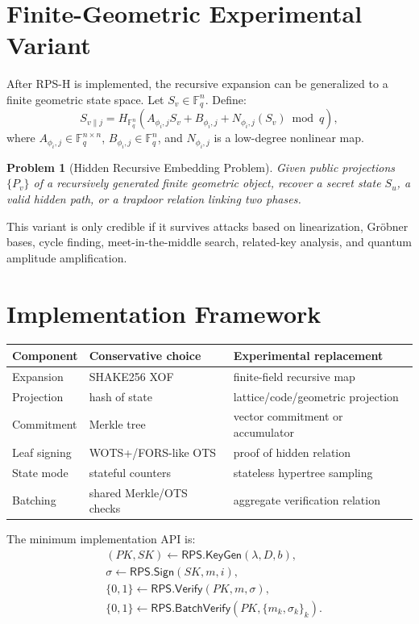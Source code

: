 \documentclass[11pt]{article}
\newtheorem{problem}{Problem}
\begin{document}
\section{Finite-Geometric Experimental Variant}

After RPS-H is implemented, the recursive expansion can be generalized to a
finite geometric state space. Let $S_v \in \mathbb{F}_q^n$. Define:
\[
  S_{v\parallel j}
  = H_{\mathbb{F}_q^n}
    \left(A_{\phi_i,j}S_v + B_{\phi_i,j}
      + N_{\phi_i,j}(S_v) \bmod q\right),
\]
where $A_{\phi_i,j}\in\mathbb{F}_q^{n\times n}$, $B_{\phi_i,j}\in\mathbb{F}_q^n$,
and $N_{\phi_i,j}$ is a low-degree nonlinear map.

\begin{problem}[Hidden Recursive Embedding Problem]
Given public projections $\{P_v\}$ of a recursively generated finite geometric
object, recover a secret state $S_u$, a valid hidden path, or a trapdoor relation
linking two phases.
\end{problem}

This variant is only credible if it survives attacks based on linearization,
Gröbner bases, cycle finding, meet-in-the-middle search, related-key analysis,
and quantum amplitude amplification.

\section{Implementation Framework}

\begin{center}
\begin{tabular}{lll}
\toprule
Component & Conservative choice & Experimental replacement \\
\midrule
Expansion & SHAKE256 XOF & finite-field recursive map \\
Projection & hash of state & lattice/code/geometric projection \\
Commitment & Merkle tree & vector commitment or accumulator \\
Leaf signing & WOTS+/FORS-like OTS & proof of hidden relation \\
State mode & stateful counters & stateless hypertree sampling \\
Batching & shared Merkle/OTS checks & aggregate verification relation \\
\bottomrule
\end{tabular}
\end{center}

The minimum implementation API is:
\[
\begin{aligned}
  &(PK,SK) \leftarrow \mathsf{RPS.KeyGen}(\lambda,D,b),\\
  &\sigma \leftarrow \mathsf{RPS.Sign}(SK,m,i),\\
  &\{0,1\} \leftarrow \mathsf{RPS.Verify}(PK,m,\sigma),\\
  &\{0,1\} \leftarrow \mathsf{RPS.BatchVerify}(PK,\{m_k,\sigma_k\}_k).
\end{aligned}
\]
\end{document}
